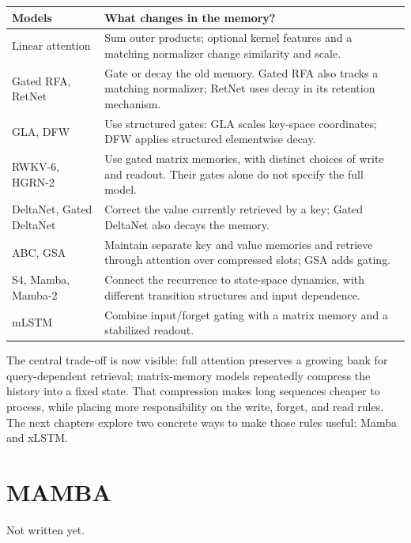 \documentclass[11pt, oneside]{book}
\begin{document}
\begin{center}
\small
\renewcommand{\arraystretch}{1.22}
\begin{tabular}{@{}>{\raggedright\arraybackslash}p{3.7cm}>{\raggedright\arraybackslash}p{11.7cm}@{}}
\toprule
\textbf{Models} & \textbf{What changes in the memory?}\\
\midrule
Linear attention & Sum outer products; optional kernel features and a matching normalizer change similarity and scale.\\
Gated RFA, RetNet & Gate or decay the old memory. Gated RFA also tracks a matching normalizer; RetNet uses decay in its retention mechanism.\\
GLA, DFW & Use structured gates: GLA scales key-space coordinates; DFW applies structured elementwise decay.\\
RWKV-6, HGRN-2 & Use gated matrix memories, with distinct choices of write and readout. Their gates alone do not specify the full model.\\
DeltaNet, Gated DeltaNet & Correct the value currently retrieved by a key; Gated DeltaNet also decays the memory.\\
ABC, GSA & Maintain separate key and value memories and retrieve through attention over compressed slots; GSA adds gating.\\
S4, Mamba, Mamba-2 & Connect the recurrence to state-space dynamics, with different transition structures and input dependence.\\
mLSTM & Combine input/forget gating with a matrix memory and a stabilized readout.\\
\bottomrule
\end{tabular}
\end{center}

The central trade-off is now visible: full attention preserves a growing bank for query-dependent retrieval; matrix-memory models repeatedly compress the history into a fixed state. That compression makes long sequences cheaper to process, while placing more responsibility on the write, forget, and read rules. The next chapters explore two concrete ways to make those rules useful: Mamba and xLSTM.

\chapter{MAMBA}\label{ch:source-7}

{\small\color{gray!70!black} Not written yet.}
\end{document}
